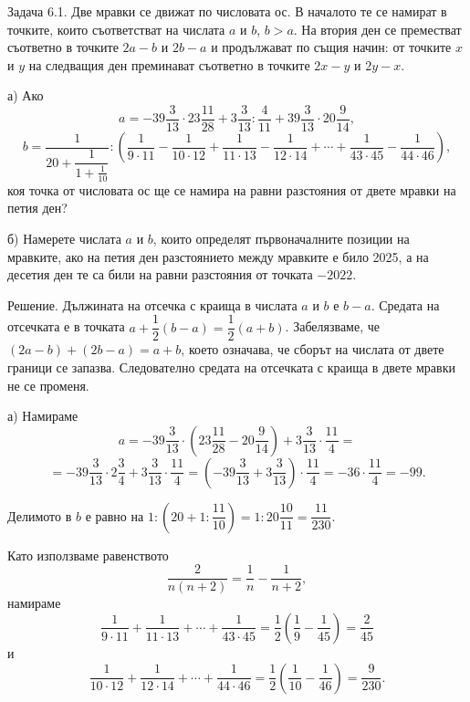 
Задача 6.1. Две мравки се движат по числовата ос. В началото те се намират в точките, които съответстват на числата $a$ и $b$, $b>a$. На втория ден се преместват съответно в точките $2a-b$ и $2b-a$ и продължават по същия начин: от точките $x$ и $y$ на следващия ден преминават съответно в точките $2x-y$ и $2y-x$.

а) Ако
$$
a=-39\frac{3}{13}\cdot23\frac{11}{28}+3\frac{3}{13}:\frac{4}{11}+39\frac{3}{13}\cdot20\frac{9}{14},
$$
$$
b=\frac{1}{20+\dfrac{1}{1+\frac{1}{10}}}:\left(\frac{1}{9\cdot11}-\frac{1}{10\cdot12}+\frac{1}{11\cdot13}-\frac{1}{12\cdot14}+\cdots+\frac{1}{43\cdot45}-\frac{1}{44\cdot46}\right),
$$
коя точка от числовата ос ще се намира на равни разстояния от двете мравки на петия ден?

б) Намерете числата $a$ и $b$, които определят първоначалните позиции на мравките, ако на петия ден разстоянието между мравките е било 2025, а на десетия ден те са били на равни разстояния от точката $-2022$.

Решение. Дължината на отсечка с краища в числата $a$ и $b$ е $b-a$. Средата на отсечката е в точката $a+\dfrac12(b-a)=\dfrac12(a+b)$. Забелязваме, че $(2a-b)+(2b-a)=a+b$, което означава, че сборът на числата от двете граници се запазва. Следователно средата на отсечката с краища в двете мравки не се променя.

а) Намираме
$$
a=-39\frac{3}{13}\cdot\left(23\frac{11}{28}-20\frac{9}{14}\right)+3\frac{3}{13}\cdot\frac{11}{4}=
$$
$$
=-39\frac{3}{13}\cdot2\frac{3}{4}+3\frac{3}{13}\cdot\frac{11}{4}=\left(-39\frac{3}{13}+3\frac{3}{13}\right)\cdot\frac{11}{4}=-36\cdot\frac{11}{4}=-99.
$$

Делимото в $b$ е равно на $1:\left(20+1:\dfrac{11}{10}\right)=1:20\dfrac{10}{11}=\dfrac{11}{230}$.

Като използваме равенството
$$
\frac{2}{n(n+2)}=\frac1n-\frac{1}{n+2},
$$
намираме
$$
\frac{1}{9\cdot11}+\frac{1}{11\cdot13}+\cdots+\frac{1}{43\cdot45}=\frac12\left(\frac19-\frac{1}{45}\right)=\frac{2}{45}
$$
и
$$
\frac{1}{10\cdot12}+\frac{1}{12\cdot14}+\cdots+\frac{1}{44\cdot46}=\frac12\left(\frac{1}{10}-\frac{1}{46}\right)=\frac{9}{230}.
$$

